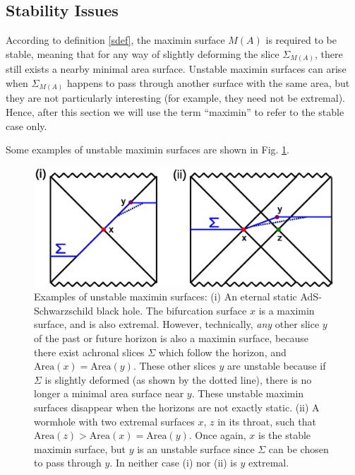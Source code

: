 \documentclass[12pt]{article}
\begin{document}
\subsection{Stability Issues}\label{stable}

According to definition \ref{sdef}, the maximin surface $M(A)$ is required to be stable, meaning that for any way of slightly deforming the slice $\Sigma_{M(A)}$, there still exists a nearby minimal area surface.  Unstable maximin surfaces can arise when $\Sigma_{M(A)}$ happens to pass through another surface with the same area, but they are not particularly interesting (for example, they need not be extremal).  Hence, after this section we will use the term ``maximin'' to refer to the stable case only.

Some examples of unstable maximin surfaces are shown in Fig. \ref{unstable}.
\begin{figure}[hbt]
\centering
\includegraphics[width=.7\textwidth]{unstable.eps}
\caption{\footnotesize Examples of unstable maximin surfaces: (i) An eternal static AdS-Schwarzschild black hole.  The bifurcation surface $x$ is a maximin surface, and is also extremal.  However, technically, \emph{any} other slice $y$ of the past or future horizon is also a maximin surface, because there exist achronal slices $\Sigma$ which follow the horizon, and $\mathrm{Area}(x) = \mathrm{Area}(y)$.  These other slices $y$ are unstable because if $\Sigma$ is slightly deformed (as shown by the dotted line), there is no longer a minimal area surface near $y$.  These unstable maximin surfaces disappear when the horizons are not exactly static.  (ii) A wormhole with two extremal surfaces $x$, $z$ in its throat, such that $\mathrm{Area}(z) > \mathrm{Area}(x) = \mathrm{Area}(y)$.  Once again, $x$ is the stable maximin surface, but $y$ is an unstable surface since $\Sigma$ can be chosen to pass through $y$.  In neither case (i) nor (ii) is $y$ extremal.}\label{unstable}
\end{figure}
\end{document}
